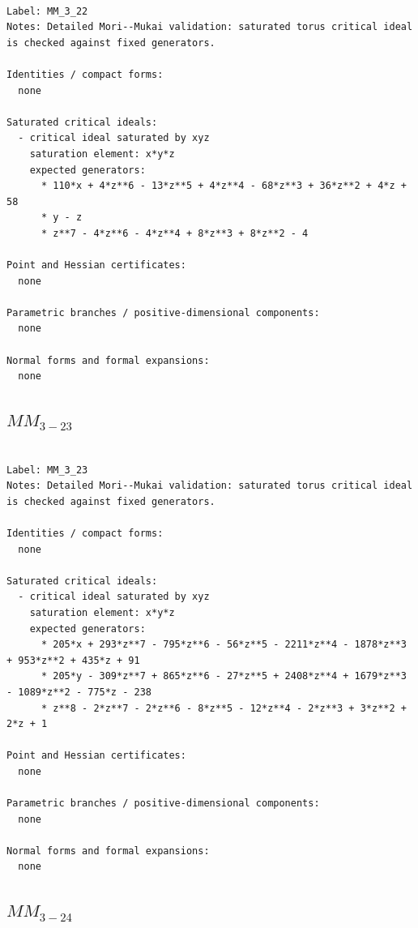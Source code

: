 \documentclass[10pt,a4paper]{article}
\begin{document}
\begin{lstlisting}

Label: MM_3_22
Notes: Detailed Mori--Mukai validation: saturated torus critical ideal is checked against fixed generators.

Identities / compact forms:
  none

Saturated critical ideals:
  - critical ideal saturated by xyz
    saturation element: x*y*z
    expected generators:
      * 110*x + 4*z**6 - 13*z**5 + 4*z**4 - 68*z**3 + 36*z**2 + 4*z + 58
      * y - z
      * z**7 - 4*z**6 - 4*z**4 + 8*z**3 + 8*z**2 - 4

Point and Hessian certificates:
  none

Parametric branches / positive-dimensional components:
  none

Normal forms and formal expansions:
  none

\end{lstlisting}

\subsection*{$ MM_{3-23} $}

\begin{lstlisting}

Label: MM_3_23
Notes: Detailed Mori--Mukai validation: saturated torus critical ideal is checked against fixed generators.

Identities / compact forms:
  none

Saturated critical ideals:
  - critical ideal saturated by xyz
    saturation element: x*y*z
    expected generators:
      * 205*x + 293*z**7 - 795*z**6 - 56*z**5 - 2211*z**4 - 1878*z**3 + 953*z**2 + 435*z + 91
      * 205*y - 309*z**7 + 865*z**6 - 27*z**5 + 2408*z**4 + 1679*z**3 - 1089*z**2 - 775*z - 238
      * z**8 - 2*z**7 - 2*z**6 - 8*z**5 - 12*z**4 - 2*z**3 + 3*z**2 + 2*z + 1

Point and Hessian certificates:
  none

Parametric branches / positive-dimensional components:
  none

Normal forms and formal expansions:
  none

\end{lstlisting}

\subsection*{$ MM_{3-24} $}
\end{document}
